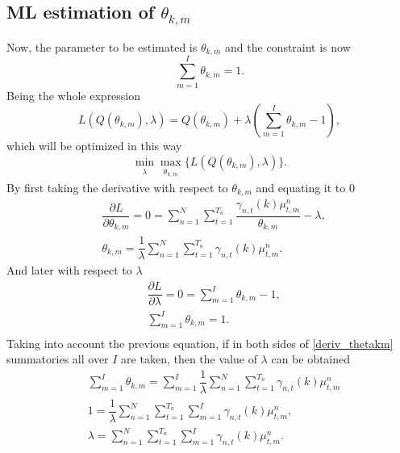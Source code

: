\documentclass[12pt]{article}
\begin{document}
\subsection{ML estimation of $\theta_{k,m}$}
Now, the parameter to be estimated is $\theta_{k,m}$ and the constraint is now
\begin{equation}
\label{constraint_thetakm}
\sum \limits_{m=1}^{I} \theta_{k,m} = 1.
\end{equation}
Being the whole expression
\begin{equation}
\label{lagrange_thetakm}
L\left( Q(\theta_{k,m}),\lambda \right) = Q(\theta_{k,m}) + \lambda \left( \sum \limits_{m=1}^{I} \theta_{k,m} - 1 \right),
\end{equation}
which will be optimized in this way
\begin{equation}
\label{minmax_lagrange_thetakm}
\min_{\substack{\lambda}} \max_{\substack{\theta_{k,m}}} \lbrace L\left( Q(\theta_{k,m}),\lambda \right) \rbrace.
\end{equation}
By first taking the derivative with respect to $\theta_{k,m}$ and equating it to 0
\begin{equation}
\label{deriv_thetakm}
\begin{split}
& \dfrac{\partial L}{\partial \theta_{k,m}} = 0 = \sum \limits_{n=1}^{N}\sum _ { t = 1 } ^ { T _ { n } } \dfrac{\gamma_{n,t}(k)\mu_{t,m}^{n}}{\theta_{k,m}} - \lambda, \\
& \theta_{k,m} = \dfrac{1}{\lambda} \sum \limits_{n=1}^{N} \sum _ { t = 1 } ^ { T _ { n } }\gamma_{n,t}(k)\mu_{t,m}^{n}.
\end{split}
\end{equation}
And later with respect to $\lambda$
\begin{equation}
\begin{split}
& \dfrac{\partial L}{\partial \lambda} = 0 = \sum \limits_{m=1}^{I} \theta_{k,m} - 1,\\
& \sum \limits_{m=1}^{I} \theta_{k,m} = 1.\\
\end{split}
\end{equation}
Taking into account the previous equation, if in both sides of \eqref{deriv_thetakm} summatories all over $I$ are taken, then the value of $\lambda$ can be obtained
\begin{equation}
\begin{split}
& \sum \limits_{m=1}^{I}\theta_{k,m} = \sum \limits_{m=1}^{I} \dfrac{1}{\lambda} \sum \limits_{n=1}^{N}\sum _ { t = 1 } ^ { T _ { n } } \gamma_{n,t}(k)\mu_{t,m}^{n}\\
& 1 = \dfrac{1}{\lambda} \sum \limits_{n=1}^{N}\sum _ { t = 1 } ^ { T _ { n } }\sum \limits_{m=1}^{I}\gamma_{n,t}(k)\mu_{t,m}^{n},\\
& \lambda = \sum \limits_{n=1}^{N}\sum \limits_{ t = 1 } ^ { T _ { n }}\sum \limits_{m=1}^{I}\gamma_{n,t}(k)\mu_{t,m}^{n}.\\
\end{split}
\end{equation}
\end{document}
